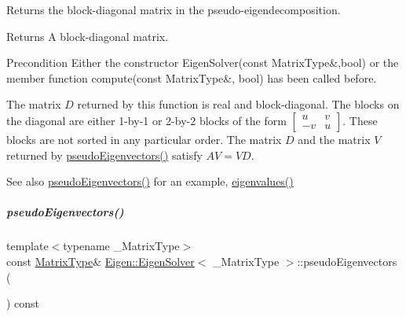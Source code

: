 Returns the block-\/diagonal matrix in the pseudo-\/eigendecomposition. 

\begin{DoxyReturn}{Returns}
A block-\/diagonal matrix.
\end{DoxyReturn}
\begin{DoxyPrecond}{Precondition}
Either the constructor Eigen\+Solver(const Matrix\+Type\&,bool) or the member function compute(const Matrix\+Type\&, bool) has been called before.
\end{DoxyPrecond}
The matrix $ D $ returned by this function is real and block-\/diagonal. The blocks on the diagonal are either 1-\/by-\/1 or 2-\/by-\/2 blocks of the form $ \begin{bmatrix} u & v \\ -v & u \end{bmatrix} $. These blocks are not sorted in any particular order. The matrix $ D $ and the matrix $ V $ returned by \hyperlink{group___eigenvalues___module_a4e796226f06e1f7347cf03a38755a155}{pseudo\+Eigenvectors()} satisfy $ AV = VD $.

\begin{DoxySeeAlso}{See also}
\hyperlink{group___eigenvalues___module_a4e796226f06e1f7347cf03a38755a155}{pseudo\+Eigenvectors()} for an example, \hyperlink{group___eigenvalues___module_a114189009e42f5e03372a7a3dfa33b97}{eigenvalues()} 
\end{DoxySeeAlso}
\mbox{\label{group___eigenvalues___module_a4e796226f06e1f7347cf03a38755a155}} 
\subparagraph{\texorpdfstring{pseudo\+Eigenvectors()}{pseudoEigenvectors()}\hspace{0.1cm}{\footnotesize\ttfamily [1/2]}}
{\footnotesize\ttfamily template$<$typename \+\_\+\+Matrix\+Type$>$ \\
const \hyperlink{group___eigenvalues___module_a83acd180404ddaac8a678fa65a6b632b}{Matrix\+Type}\& \hyperlink{group___eigenvalues___module_class_eigen_1_1_eigen_solver}{Eigen\+::\+Eigen\+Solver}$<$ \+\_\+\+Matrix\+Type $>$\+::pseudo\+Eigenvectors (\begin{DoxyParamCaption}{ }\end{DoxyParamCaption}) const\hspace{0.3cm}{\ttfamily [inline]}}



